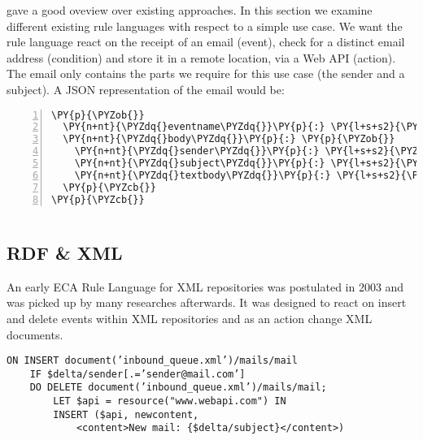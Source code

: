 
\cite{2009-Paschke_Boley-RCER.pdf} gave a good oveview over existing approaches.
In this section we examine different existing rule languages with respect to a simple use case.
We want the rule language react on the receipt of an email (event), check for a distinct email address (condition) and store it in a remote location, via a Web API (action).
The email only contains the parts we require for this use case (the sender and a subject). A JSON representation of the email would be:

\begin{Verbatim}[frame=single,fontsize=\footnotesize,commandchars=\\\{\},numbers=left,firstnumber=1,stepnumber=1,xleftmargin
=.3in]
\PY{p}{\PYZob{}}
  \PY{n+nt}{\PYZdq{}eventname\PYZdq{}}\PY{p}{:} \PY{l+s+s2}{\PYZdq{}email\PYZdq{}}\PY{p}{,}
  \PY{n+nt}{\PYZdq{}body\PYZdq{}}\PY{p}{:} \PY{p}{\PYZob{}}
    \PY{n+nt}{\PYZdq{}sender\PYZdq{}}\PY{p}{:} \PY{l+s+s2}{\PYZdq{}sender@mail.com\PYZdq{}}\PY{p}{,}
    \PY{n+nt}{\PYZdq{}subject\PYZdq{}}\PY{p}{:} \PY{l+s+s2}{\PYZdq{}Important subject!\PYZdq{}}\PY{p}{,}
    \PY{n+nt}{\PYZdq{}textbody\PYZdq{}}\PY{p}{:} \PY{l+s+s2}{\PYZdq{}Hi User,\PYZbs{}n\PYZbs{}nThis is a lengthy mail body\PYZdq{}}
  \PY{p}{\PYZcb{}}
\PY{p}{\PYZcb{}}
\end{Verbatim}
\begin{lstlisting}[caption=Example E-Mail event expressed in JSON]
\end{lstlisting}

\subsection{RDF \& XML}
An early ECA Rule Language for XML repositories\cite{Papamarkos03event-condition-actionrule} was postulated in 2003 and was picked up by many researches afterwards. It was designed to react on insert and delete events within XML repositories and as an action change XML documents.

\begin{lstlisting}[frame=single,float=h,label=lstrdf,language=RDF,caption=E-Mail Example rule expressed in RDF]
	ON INSERT document(’inbound_queue.xml’)/mails/mail
	IF $delta/sender[.=’sender@mail.com’]
	DO DELETE document(’inbound_queue.xml’)/mails/mail;
		LET $api = resource("www.webapi.com") IN
		INSERT ($api, newcontent,
			<content>New mail: {$delta/subject}</content>)
\end{lstlisting}


